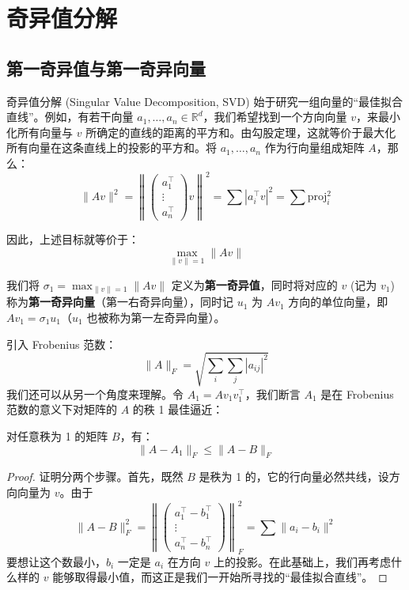 \chapter{奇异值分解}

\section{第一奇异值与第一奇异向量}

奇异值分解 (Singular Value Decomposition, SVD) 始于研究一组向量的“最佳拟合直线”。例如，有若干向量 $a_1, \dots, a_n \in \mathbb{R}^d$，我们希望找到一个方向向量 $v$，来最小化所有向量与 $v$ 所确定的直线的距离的平方和。由勾股定理，这就等价于最大化所有向量在这条直线上的投影的平方和。将 $a_1, \dots, a_n$ 作为行向量组成矩阵 $A$，那么：
\[
    \|Av\|^2 = \left\| \begin{pmatrix} a_1^\top \\ \vdots \\ a_n^\top \end{pmatrix} v \right\|^2 = \sum |a_i^\top v|^2 = \sum \text{proj}_i^2
\]

因此，上述目标就等价于：
\[
    \max_{\|v\|=1} \|Av\|
\]

我们将 $\sigma_1 = \max_{\|v\|=1} \|Av\|$ 定义为\textbf{第一奇异值}，同时将对应的 $v$ (记为 $v_1$) 称为\textbf{第一奇异向量}（第一右奇异向量），同时记 $u_1$ 为 $A v_1$ 方向的单位向量，即 $A v_1 = \sigma_1 u_1$（$u_1$ 也被称为第一左奇异向量）。

引入 Frobenius 范数：
\[
    \|A\|_F = \sqrt{\sum_i \sum_j |a_{ij}|^2}
\]
我们还可以从另一个角度来理解。令 $A_1 = A v_1 v_1^\top$，我们断言 $A_1$ 是在 Frobenius 范数的意义下对矩阵的 $A$ 的秩 1 最佳逼近：

\begin{proposition}
    对任意秩为 1 的矩阵 $B$，有：
    \[
        \|A - A_1\|_F \le \|A - B\|_F
    \]
\end{proposition}

\begin{proof}
    证明分两个步骤。首先，既然 $B$ 是秩为 1 的，它的行向量必然共线，设方向向量为 $v$。由于
    \[
        \|A - B\|_F^2 = \left\| \begin{pmatrix} a_1^\top - b_1^\top \\ \vdots \\ a_n^\top - b_n^\top \end{pmatrix} \right\|_F^2 = \sum \|a_i - b_i\|^2
    \]
    要想让这个数最小，$b_i$ 一定是 $a_i$ 在方向 $v$ 上的投影。在此基础上，我们再考虑什么样的 $v$ 能够取得最小值，而这正是我们一开始所寻找的“最佳拟合直线”。
\end{proof}

